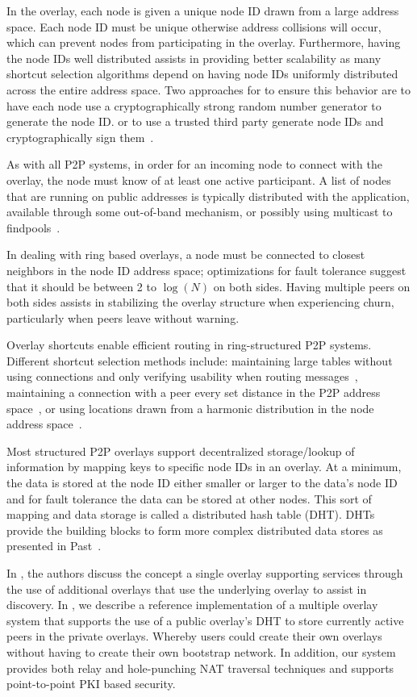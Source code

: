\documentclass[letterpaper,twocolumn,10pt]{article}
\begin{document}
In the overlay, each node is given a unique node ID drawn from a large address
space.  Each node ID must be unique otherwise address collisions will occur,
which can prevent nodes from participating in the overlay.  Furthermore, having
the node IDs well distributed assists in providing better scalability as many
shortcut selection algorithms depend on having node IDs uniformly distributed
across the entire address space.  Two approaches for to ensure this behavior are
to have each node use a cryptographically strong random number generator to
generate the node ID.  or to use a trusted third party generate node IDs and
cryptographically sign them~\cite{secure_routing}.

As with all P2P systems, in order for an incoming node to connect with
the overlay, the node must know of at least one active participant.  A list of
nodes that are running on public addresses is typically distributed with the
application, available through some out-of-band mechanism, or possibly using
multicast to findpools~\cite{pastry}.

In dealing with ring based overlays, a node must be connected to closest
neighbors in the node ID address space; optimizations for fault tolerance
suggest that it should be between 2 to $\log(N)$ on both sides.  Having
multiple peers on both sides assists in stabilizing the overlay structure
when experiencing churn, particularly when peers leave without warning.

Overlay shortcuts enable efficient routing in ring-structured P2P systems.
Different shortcut selection methods include: maintaining large tables without
using connections and only verifying usability when routing
messages~\cite{pastry, kademlia}, maintaining a connection with a peer every
set distance in the P2P address space~\cite{chord}, or using locations drawn
from a harmonic distribution in the node address space~\cite{symphony}.

Most structured P2P overlays support decentralized storage/lookup of information by
mapping keys to specific node IDs in an overlay.  At a minimum, the data is stored
at the node ID either smaller or larger to the data's node ID and for fault
tolerance the data can be stored at other nodes.  This sort of mapping
and data storage is called a distributed hash table (DHT).  DHTs provide the
building blocks to form more complex distributed data stores as presented in
Past~\cite{past}.

In \cite{one_ring, randpeer, can_multicast}, the authors discuss the concept a
single overlay supporting services through the use of additional overlays
that use the underlying overlay to assist in discovery.  In \cite{icdcs10}, we
describe a reference implementation of a multiple overlay system that supports
the use of a public overlay's DHT to store currently active peers in the private
overlays.  Whereby users could create their own overlays without having to
create their own bootstrap network.  In addition, our system provides both relay
and hole-punching NAT traversal techniques and supports point-to-point PKI
based security.
\end{document}

